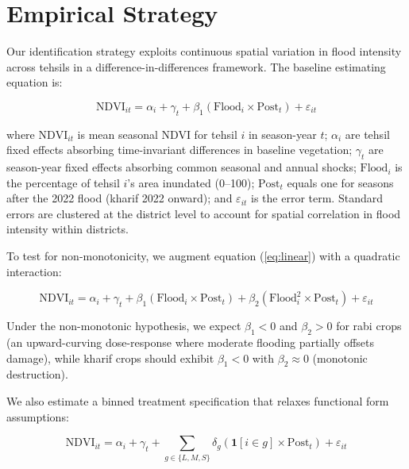 \documentclass[12pt]{article}
\begin{document}


\section{Empirical Strategy}\label{sec:strategy}

Our identification strategy exploits continuous spatial variation in flood intensity across tehsils in a difference-in-differences framework. The baseline estimating equation is:

\begin{equation}\label{eq:linear}
\text{NDVI}_{it} = \alpha_i + \gamma_t + \beta_1 (\text{Flood}_i \times \text{Post}_t) + \varepsilon_{it}
\end{equation}

\noindent where $\text{NDVI}_{it}$ is mean seasonal NDVI for tehsil $i$ in season-year $t$; $\alpha_i$ are tehsil fixed effects absorbing time-invariant differences in baseline vegetation; $\gamma_t$ are season-year fixed effects absorbing common seasonal and annual shocks; $\text{Flood}_i$ is the percentage of tehsil $i$'s area inundated (0--100); $\text{Post}_t$ equals one for seasons after the 2022 flood (kharif 2022 onward); and $\varepsilon_{it}$ is the error term. Standard errors are clustered at the district level to account for spatial correlation in flood intensity within districts.

To test for non-monotonicity, we augment equation (\ref{eq:linear}) with a quadratic interaction:

\begin{equation}\label{eq:quad}
\text{NDVI}_{it} = \alpha_i + \gamma_t + \beta_1 (\text{Flood}_i \times \text{Post}_t) + \beta_2 (\text{Flood}_i^2 \times \text{Post}_t) + \varepsilon_{it}
\end{equation}

\noindent Under the non-monotonic hypothesis, we expect $\beta_1 < 0$ and $\beta_2 > 0$ for rabi crops (an upward-curving dose-response where moderate flooding partially offsets damage), while kharif crops should exhibit $\beta_1 < 0$ with $\beta_2 \approx 0$ (monotonic destruction).

We also estimate a binned treatment specification that relaxes functional form assumptions:

\begin{equation}\label{eq:binned}
\text{NDVI}_{it} = \alpha_i + \gamma_t + \sum_{g \in \{L, M, S\}} \delta_g (\mathbf{1}[i \in g] \times \text{Post}_t) + \varepsilon_{it}
\end{equation}
\end{document}
